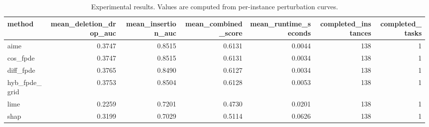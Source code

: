 \begin{table}[t]
\caption{Experimental results. Values are computed from per-instance perturbation curves.}
\label{tab:main_results_computed}
\centering
\begin{tabular}{lrrrrrr}
\toprule
method & mean\_deletion\_drop\_auc & mean\_insertion\_auc & mean\_combined\_score & mean\_runtime\_seconds & completed\_instances & completed\_tasks \\
\midrule
aime & 0.3747 & 0.8515 & 0.6131 & 0.0044 & 138 & 1 \\
cos\_fpde & 0.3747 & 0.8515 & 0.6131 & 0.0034 & 138 & 1 \\
diff\_fpde & 0.3765 & 0.8490 & 0.6127 & 0.0034 & 138 & 1 \\
hyb\_fpde\_grid & 0.3753 & 0.8504 & 0.6128 & 0.0053 & 138 & 1 \\
lime & 0.2259 & 0.7201 & 0.4730 & 0.0201 & 138 & 1 \\
shap & 0.3199 & 0.7029 & 0.5114 & 0.0626 & 138 & 1 \\
\bottomrule
\end{tabular}

\end{table}
